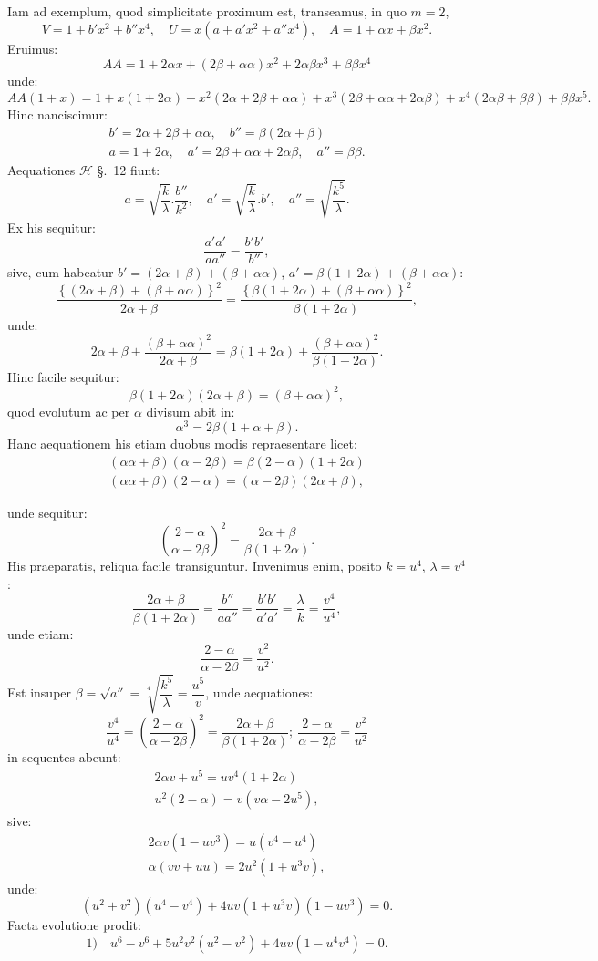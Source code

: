 \documentclass{article}
\begin{document}
Iam ad exemplum, quod simplicitate proximum est, transeamus, in quo $m=2$,
\[
V=1+b'x^{2}+b''x^{4},\quad U=x(a+a'x^{2}+a''x^{4}),\quad A=1+\alpha x+\beta x^{2}.
\]
Eruimus:
\[
AA=1+2\alpha x+(2\beta+\alpha\alpha)x^{2}+2\alpha\beta x^{3}+\beta\beta x^{4}
\]
unde:
\[
AA(1+x)=1+x(1+2\alpha)+x^{2}(2\alpha+2\beta+\alpha\alpha)+x^{3}(2\beta+\alpha\alpha+2\alpha\beta)+x^{4}(2\alpha\beta+\beta\beta)+\beta\beta x^{5}.
\]
Hinc nanciscimur:
\[
\begin{gathered}
b'=2\alpha+2\beta+\alpha\alpha,\quad b''=\beta(2\alpha+\beta)\\
a=1+2\alpha,\quad a'=2\beta+\alpha\alpha+2\alpha\beta,\quad a''=\beta\beta.
\end{gathered}
\]
Aequationes $\mathcal{H}$ §.\ 12 fiunt:
\[
a=\sqrt{\frac{k}{\lambda}}.\frac{b''}{k^{2}},\quad a'=\sqrt{\frac{k}{\lambda}}.b',\quad a''=\sqrt{\frac{k^{5}}{\lambda}}.
\]
Ex his sequitur:
\[
\frac{a'a'}{aa''}=\frac{b'b'}{b''},
\]
sive, cum habeatur $b'=(2\alpha+\beta)+(\beta+\alpha\alpha)$, $a'=\beta(1+2\alpha)+(\beta+\alpha\alpha)$:
\[
\frac{\left\{(2\alpha+\beta)+(\beta+\alpha\alpha)\right\}^{2}}{2\alpha+\beta}=\frac{\left\{\beta(1+2\alpha)+(\beta+\alpha\alpha)\right\}^{2}}{\beta(1+2\alpha)},
\]
unde:
\[
2\alpha+\beta+\frac{(\beta+\alpha\alpha)^{2}}{2\alpha+\beta}=\beta(1+2\alpha)+\frac{(\beta+\alpha\alpha)^{2}}{\beta(1+2\alpha)}.
\]
Hinc facile sequitur:
\[
\beta(1+2\alpha)(2\alpha+\beta)=(\beta+\alpha\alpha)^{2},
\]
quod evolutum ac per $\alpha$ divisum abit in:
\[
\alpha^{3}=2\beta(1+\alpha+\beta).
\]
Hanc aequationem his etiam duobus modis repraesentare licet:
\[
\begin{gathered}
(\alpha\alpha+\beta)(\alpha-2\beta)=\beta(2-\alpha)(1+2\alpha)\\
(\alpha\alpha+\beta)(2-\alpha)=(\alpha-2\beta)(2\alpha+\beta),
\end{gathered}
\]

unde sequitur:
\[
\left(\frac{2-\alpha}{\alpha-2\beta}\right)^{2}=\frac{2\alpha+\beta}{\beta(1+2\alpha)}.
\]
His praeparatis, reliqua facile transiguntur. Invenimus enim, posito $k=u^{4}$, $\lambda=v^{4}$:
\[
\frac{2\alpha+\beta}{\beta(1+2\alpha)}=\frac{b''}{aa''}=\frac{b'b'}{a'a'}=\frac{\lambda}{k}=\frac{v^{4}}{u^{4}},
\]
unde etiam:
\[
\frac{2-\alpha}{\alpha-2\beta}=\frac{v^{2}}{u^{2}}.
\]
Est insuper $\beta=\sqrt{a''}=\sqrt[4]{\dfrac{k^{5}}{\lambda}}=\dfrac{u^{5}}{v}$, unde aequationes:
\[
\frac{v^{4}}{u^{4}}=\left(\frac{2-\alpha}{\alpha-2\beta}\right)^{2}=\frac{2\alpha+\beta}{\beta(1+2\alpha)};\ \frac{2-\alpha}{\alpha-2\beta}=\frac{v^{2}}{u^{2}}
\]
in sequentes abeunt:
\[
\begin{gathered}
2\alpha v+u^{5}=uv^{4}(1+2\alpha)\\
u^{2}(2-\alpha)=v(v\alpha-2u^{5}),
\end{gathered}
\]
sive:
\[
\begin{gathered}
2\alpha v(1-uv^{3})=u(v^{4}-u^{4})\\
\alpha(vv+uu)=2u^{2}(1+u^{3}v),
\end{gathered}
\]
unde:
\[
(u^{2}+v^{2})(u^{4}-v^{4})+4uv(1+u^{3}v)(1-uv^{3})=0.
\]
Facta evolutione prodit:
\[
\text{1)}\quad u^{6}-v^{6}+5u^{2}v^{2}(u^{2}-v^{2})+4uv(1-u^{4}v^{4})=0.
\]
\end{document}
